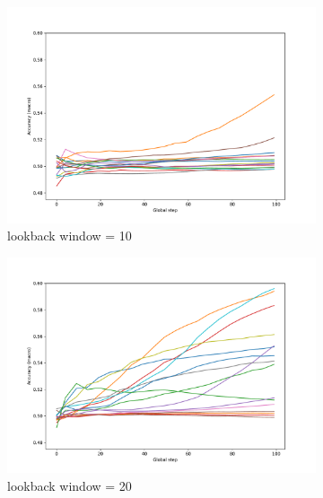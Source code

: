 \documentclass[aps,prb,groupedaddress,twocolumn,showpacs,dvipdfmx,superscriptaddress,pdftex]{revtex4-2}
\begin{document}
\begin{figure}
    \centering
    \begin{subfigure}[b]{\linewidth}
        \centering
        \includegraphics[width=\textwidth]{img/lstm_10.pdf}
        \caption{lookback window = 10}
        \label{fig:image1}
    \end{subfigure}
    \begin{subfigure}[b]{\linewidth}
        \centering
        \includegraphics[width=\textwidth]{img/lstm_20.pdf}
        \caption{lookback window = 20}
        \label{fig:image2}
    \end{subfigure}
    \begin{subfigure}[b]{\linewidth}

\end{subfigure}
\end{figure}
\end{document}
